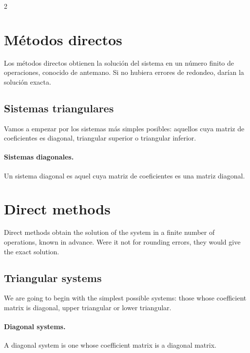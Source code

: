 \begin{paracol}{2}
\section{Métodos directos}
Los métodos directos obtienen la solución del sistema en un número finito de operaciones, conocido de antemano. Si no hubiera errores de redondeo, darían la solución exacta.

\subsection{Sistemas triangulares}
Vamos a empezar por los sistemas más simples posibles: aquellos cuya matriz de coeficientes es diagonal, triangular superior o triangular inferior.

\paragraph{Sistemas diagonales.} Un sistema diagonal es aquel cuya matriz de coeficientes es una matriz diagonal.

\switchcolumn

\section{Direct methods}
Direct methods obtain the solution of the system in a finite number of operations, known in advance. Were it not for rounding errors, they would give the exact solution.

\subsection{Triangular systems}
We are going to begin with the simplest possible systems: those whose coefficient matrix is diagonal, upper triangular or lower triangular.

\paragraph{Diagonal systems.} A diagonal system is one whose coefficient matrix is a diagonal matrix.
\end{paracol}


